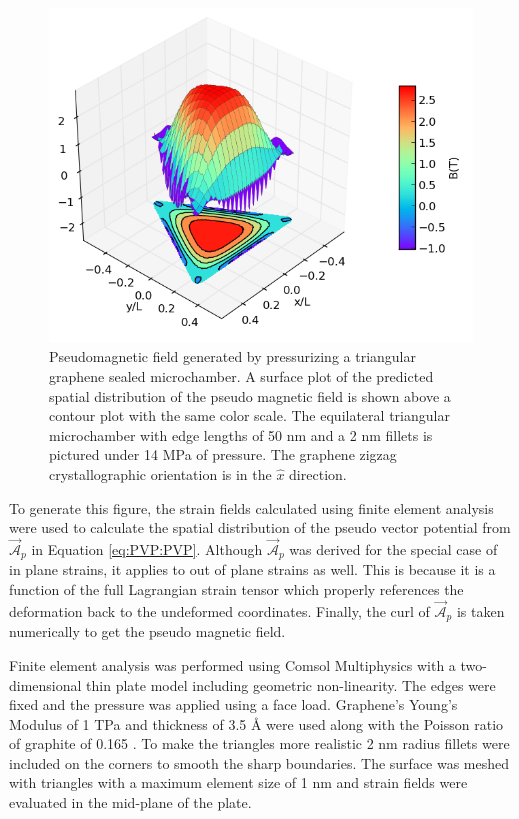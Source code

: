 \begin{figure}
  \begin{center}
  \includegraphics[scale=.75]{Figs_PVP/Triangle_PMF.png}
  \end{center}
  \caption[Pseudomagnetic field generated by pressurizing a triangular graphene sealed microchamber]{\label{fig:PVP:triangle} Pseudomagnetic field generated by pressurizing a triangular graphene sealed microchamber. A surface plot of the predicted spatial distribution of the pseudo magnetic field is shown above a contour plot with the same color scale. The equilateral triangular microchamber with edge lengths of 50 nm and a 2 nm fillets is pictured under 14 MPa of pressure. The graphene zigzag crystallographic orientation is in the $\hat{x}$ direction.}
\end{figure}

To generate this figure, the strain fields calculated using finite element analysis were used to calculate the spatial distribution of the pseudo vector potential from $\vec{\mathcal{A}}_p$ in Equation \ref{eq:PVP:PVP}.
Although $\vec{\mathcal{A}}_p$ was derived for the special case of in plane strains, it applies to out of plane strains as well.
This is because it is a function of the full Lagrangian strain tensor which properly references the deformation back to the undeformed coordinates.
Finally, the curl of $\vec{\mathcal{A}}_p$ is taken numerically to get the pseudo magnetic field.

Finite element analysis was performed using Comsol Multiphysics with a two-dimensional thin plate model including geometric non-linearity.
The edges were fixed and the pressure was applied using a face load.
Graphene's Young's Modulus of 1 TPa and thickness of 3.5 \AA \cite{Lee2008} were used along with the Poisson ratio of graphite of 0.165 \cite{Blakslee1970}.
To make the triangles more realistic 2 nm radius fillets were included on the corners to smooth the sharp boundaries.
The surface was meshed with triangles with a maximum element size of 1 nm and strain fields were evaluated in the mid-plane of the plate.

